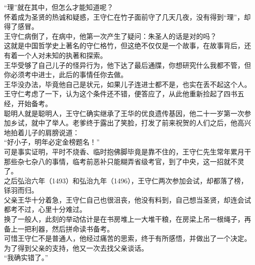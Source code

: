 \begin{multicols}{\theparacolNo}
“理”就在其中，但怎么才能知道呢？\\

怀着成为圣贤的热诚和疑惑，王守仁在竹子面前守了几天几夜，没有得到“理”，却得了感冒。\\

王守仁病倒了，在病中，他第一次产生了疑问：朱圣人的话是对的吗？\\

这就是中国哲学史上著名的守仁格竹，但这绝不仅仅是一个故事，在故事背后，还有着一个人对未知的执著和探索。\\

王华受够了自己儿子的怪异行为，他下达了最后通牒，你想研究什么我都不管，但你必须考中进士，此后的事情任你去做。\\

王华没办法，毕竟他自己是状元，如果儿子连进士都不是，也实在丢不起这个人。\\

王守仁考虑了一下，认为这个条件还不错，便答应了，从此他重新捡起了四书五经，开始备考。\\

聪明人就是聪明人，王守仁确实继承了王华的优良遗传基因，他二十一岁第一次参加乡试，就中了举人。老爹终于露出了笑脸，打发了前来祝贺的人们之后，他高兴地拍着儿子的肩膀说道：\\

“好小子，明年必定金榜题名！”\\

可是事实证明，平时不烧香、临时抱佛脚毕竟是靠不住的，王守仁先生常年累月干那些杂七杂八的事情，临考前恶补只能糊弄省级考官，到了中央，这一招就不灵了。\\

之后弘治六年（1493）和弘治九年（1496），王守仁两次参加会试，却都落了榜，铩羽而归。\\

父亲王华十分着急，王守仁自己也很沮丧，他没有料到，自己想当圣贤，却连会试都考不过，心里十分难过。\\

换了一般人，此刻的举动估计是在书房堆上一大堆干粮，在房梁上吊一根绳子，再备上一把利器，然后拼命读书备考。\\

可惜王守仁不是普通人，他经过痛苦的思索，终于有所感悟，并做出了一个决定。\\

为了得到父亲的支持，他又一次去找父亲谈话。\\

“我确实错了。”\\


\end{multicols}
